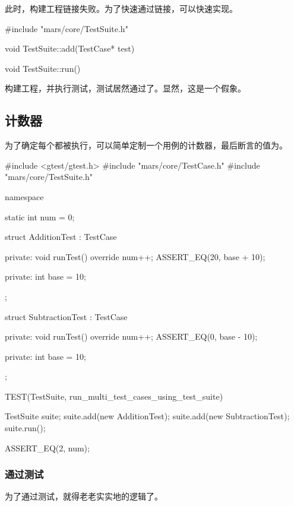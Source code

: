 \begin{content}
此时，构建工程链接失败。为了快速通过链接，可以快速实现。

\begin{leftbar}
 \begin{c++}[caption={\ttfamily{src/mars/core/TestSuite.cc}}]
#include "mars/core/TestSuite.h"

void TestSuite::add(TestCase* test) {
}

void TestSuite::run() {
}
 \end{c++}
\end{leftbar}

构建工程，并执行测试，测试居然通过了。显然，这是一个假象。

\subsection{计数器}

为了确定每个都被执行，可以简单定制一个用例的计数器，最后断言的值为。

\begin{leftbar}
 \begin{c++}[caption={\ttfamily{test/mars/core/TestSuiteSpec.cc}}]
#include <gtest/gtest.h>
#include "mars/core/TestCase.h"
#include "mars/core/TestSuite.h"

namespace {
  static int num = 0;

  struct AdditionTest : TestCase {
  private:
    void runTest() override {
      num++;
      ASSERT_EQ(20, base + 10);
    }

  private:
    int base = 10;
  };

  struct SubtractionTest : TestCase {
  private:
    void runTest() override {
      num++;
      ASSERT_EQ(0, base - 10);
    }

  private:
    int base = 10;
  };
}

TEST(TestSuite, run_multi_test_cases_using_test_suite) {
  TestSuite suite;
  suite.add(new AdditionTest);
  suite.add(new SubtractionTest);
  suite.run();

  ASSERT_EQ(2, num);
}
 \end{c++}
\end{leftbar}

\subsubsection{通过测试}

为了通过测试，就得老老实实地的逻辑了。


\end{content}
